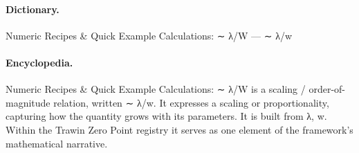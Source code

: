 \paragraph{Dictionary.}
Numeric Recipes \& Quick Example Calculations: ∼ λ/W — ∼ λ/w

\paragraph{Encyclopedia.}
Numeric Recipes \& Quick Example Calculations: ∼ λ/W is a scaling / order-of-magnitude relation, written ∼ λ/w. It expresses a scaling or proportionality, capturing how the quantity grows with its parameters. It is built from λ, w. Within the Trawin Zero Point registry it serves as one element of the framework's mathematical narrative.

